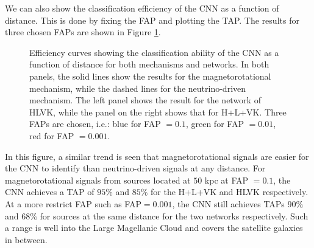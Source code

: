 \documentclass[aps,twocolumn,showpacs,groupedaddress, nofootinbib]{revtex4}  %
\begin{document}
We can also show the classification efficiency of the \ac{CNN}  as a function of distance.
This is done by fixing the \ac{FAP} and plotting the \ac{TAP}. 
The results for three chosen \acp{FAP} are shown in Figure \ref{fig:eff}.
\begin{figure}
     \begin{center}
%
        \quad
%
    \end{center}
    \caption{Efficiency curves showing the classification ability of the \ac{CNN} as a function of distance for both mechanisms and networks.
In both panels, the solid lines show the results for the magnetorotational mechanism, while the dashed lines for the neutrino-driven mechanism.
The left panel shows the result for the network of HLVK, while the panel on the right shows that for H+L+VK.
Three \acp{FAP} are chosen, i.e.: blue for \ac{FAP} $=0.1$, green for \ac{FAP} $=0.01$, red for \ac{FAP} $=0.001$.
\label{fig:eff}}%
\end{figure}
In this figure, a similar trend is seen that magnetorotational signals are easier for the \ac{CNN} to identify than neutrino-driven signals at any distance. 
For magnetorotational signals from sources located at $50$ kpc at \ac{FAP} $=0.1$, 
the \ac{CNN} achieves a \ac{TAP} of $95\%$ and $85\%$ for the H+L+VK and HLVK respectively.
At a more restrict \ac{FAP} such as \ac{FAP}$=0.001$, the \ac{CNN} still achieves \acp{TAP} $90\%$ and $68\%$ for sources at the same distance for the two networks respectively.
Such a range is well into the Large Magellanic Cloud and covers the satellite galaxies in between\cite{karachentsev2004catalog, belokurov2007cats}.
\end{document}
